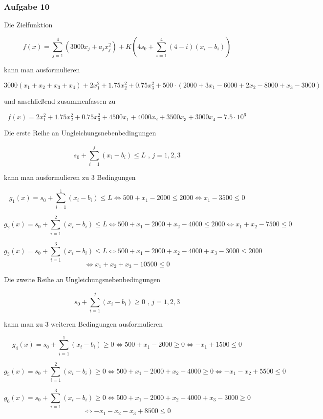 \documentclass[a4paper, 12pt]{report}
\begin{document}
\subsubsection{Aufgabe 10}
Die Zielfunktion

$$ f(x) = \sum_{j=1}^4 \left(3000x_j + a_jx_j^2\right) + K\left(4s_0 + \sum_{i=1}^4 (4-i)(x_i-b_i)\right) $$

kann man ausformulieren

\begin{adjustwidth}{-35pt}{0pt}
$$ 3000(x_1 + x_2 + x_3 + x_4) + 2x_1^2 + 1.75x_2^2 + 0.75x_3^2 + 500\cdot \left( 2000 + 3x_1 - 6000 + 2x_2 - 8000 + x_3 - 3000 \right) $$
\end{adjustwidth}

und anschließend zusammenfassen zu

$$ f(x) = 2x_1^2 + 1.75x_2^2 + 0.75x_3^2 + 4500x_1 + 4000x_2 + 3500x_3 + 3000x_4 - 7.5\cdot 10^6 $$

Die erste Reihe an Ungleichungsnebenbedingungen

$$ s_0 + \sum_{i=1}^j \left( x_i - b_i \right) \leq L \text{ , } j = 1,2,3 $$

kann man ausformulieren zu 3 Bedingungen

$$ g_1(x) = s_0 + \sum_{i=1}^1 \left(x_i - b_i\right) \leq L \Leftrightarrow 500 + x_1 - 2000 \leq 2000 \Leftrightarrow x_1 - 3500 \leq 0 $$

$$ g_2(x) = s_0 + \sum_{i=1}^2 \left(x_i - b_i\right) \leq L \Leftrightarrow 500 + x_1 - 2000 + x_2 - 4000 \leq 2000 \Leftrightarrow x_1 + x_2 - 7500 \leq 0 $$

$$ g_3(x) = s_0 + \sum_{i=1}^3 \left(x_i - b_i\right) \leq L \Leftrightarrow 500 + x_1 - 2000 + x_2 - 4000 + x_3 - 3000 \leq 2000 $$
$$ \Leftrightarrow x_1 + x_2 + x_3 - 10500 \leq 0 $$

Die zweite Reihe an Ungleichungsnebenbedingungen

$$ s_0 + \sum_{i=1}^j \left( x_i - b_i \right) \geq 0 \text{ , } j=1,2,3 $$

kann man zu 3 weiteren Bedingungen ausformulieren

$$ g_4(x) = s_0 + \sum_{i=1}^1 \left( x_i - b_i \right) \geq 0 \Leftrightarrow 500 + x_1 - 2000 \geq 0 \Leftrightarrow -x_1 + 1500 \leq 0 $$

$$ g_5(x) = s_0 + \sum_{i=1}^2 \left( x_i - b_i \right) \geq 0 \Leftrightarrow 500 + x_1 - 2000 + x_2 - 4000 \geq 0 \Leftrightarrow -x_1 - x_2 + 5500 \leq 0 $$

$$ g_6(x) = s_0 + \sum_{i=1}^3 \left( x_i - b_i \right) \geq 0 \Leftrightarrow 500 + x_1 - 2000 + x_2 - 4000 + x_3 - 3000 \geq 0 $$
$$ \Leftrightarrow -x_1 - x_2 - x_3 + 8500 \leq 0 $$
\end{document}
